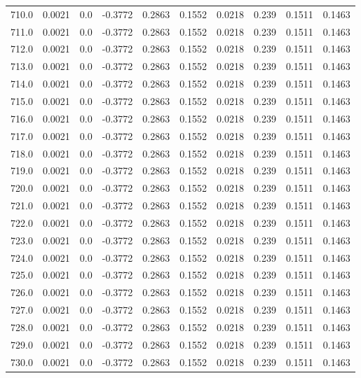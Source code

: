 \begin{longtable}{lrrrrrrrrr}
710.0 & 0.0021 & 0.0 & -0.3772 & 0.2863 & 0.1552 & 0.0218 & 0.239 & 0.1511 & 0.1463 \\
711.0 & 0.0021 & 0.0 & -0.3772 & 0.2863 & 0.1552 & 0.0218 & 0.239 & 0.1511 & 0.1463 \\
712.0 & 0.0021 & 0.0 & -0.3772 & 0.2863 & 0.1552 & 0.0218 & 0.239 & 0.1511 & 0.1463 \\
713.0 & 0.0021 & 0.0 & -0.3772 & 0.2863 & 0.1552 & 0.0218 & 0.239 & 0.1511 & 0.1463 \\
714.0 & 0.0021 & 0.0 & -0.3772 & 0.2863 & 0.1552 & 0.0218 & 0.239 & 0.1511 & 0.1463 \\
715.0 & 0.0021 & 0.0 & -0.3772 & 0.2863 & 0.1552 & 0.0218 & 0.239 & 0.1511 & 0.1463 \\
716.0 & 0.0021 & 0.0 & -0.3772 & 0.2863 & 0.1552 & 0.0218 & 0.239 & 0.1511 & 0.1463 \\
717.0 & 0.0021 & 0.0 & -0.3772 & 0.2863 & 0.1552 & 0.0218 & 0.239 & 0.1511 & 0.1463 \\
718.0 & 0.0021 & 0.0 & -0.3772 & 0.2863 & 0.1552 & 0.0218 & 0.239 & 0.1511 & 0.1463 \\
719.0 & 0.0021 & 0.0 & -0.3772 & 0.2863 & 0.1552 & 0.0218 & 0.239 & 0.1511 & 0.1463 \\
720.0 & 0.0021 & 0.0 & -0.3772 & 0.2863 & 0.1552 & 0.0218 & 0.239 & 0.1511 & 0.1463 \\
721.0 & 0.0021 & 0.0 & -0.3772 & 0.2863 & 0.1552 & 0.0218 & 0.239 & 0.1511 & 0.1463 \\
722.0 & 0.0021 & 0.0 & -0.3772 & 0.2863 & 0.1552 & 0.0218 & 0.239 & 0.1511 & 0.1463 \\
723.0 & 0.0021 & 0.0 & -0.3772 & 0.2863 & 0.1552 & 0.0218 & 0.239 & 0.1511 & 0.1463 \\
724.0 & 0.0021 & 0.0 & -0.3772 & 0.2863 & 0.1552 & 0.0218 & 0.239 & 0.1511 & 0.1463 \\
725.0 & 0.0021 & 0.0 & -0.3772 & 0.2863 & 0.1552 & 0.0218 & 0.239 & 0.1511 & 0.1463 \\
726.0 & 0.0021 & 0.0 & -0.3772 & 0.2863 & 0.1552 & 0.0218 & 0.239 & 0.1511 & 0.1463 \\
727.0 & 0.0021 & 0.0 & -0.3772 & 0.2863 & 0.1552 & 0.0218 & 0.239 & 0.1511 & 0.1463 \\
728.0 & 0.0021 & 0.0 & -0.3772 & 0.2863 & 0.1552 & 0.0218 & 0.239 & 0.1511 & 0.1463 \\
729.0 & 0.0021 & 0.0 & -0.3772 & 0.2863 & 0.1552 & 0.0218 & 0.239 & 0.1511 & 0.1463 \\
730.0 & 0.0021 & 0.0 & -0.3772 & 0.2863 & 0.1552 & 0.0218 & 0.239 & 0.1511 & 0.1463 \\

\end{longtable}
